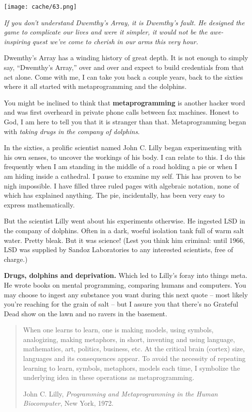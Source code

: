 \documentclass[12pt,twoside]{report}
\begin{document}
	\texttt{[image: cache/63.png]}

{\em If you don't understand Dwemthy's Array, it is Dwemthy's
  fault. He designed the game to complicate our lives and were it
  simpler, it would not be the awe-inspiring quest we've come to
  cherish in our arms this very hour.}

Dwemthy's Array has a winding history of great depth.  It is not
enough to simply say, ``Dwemthy's Array,'' over and over and expect to
build credentials from that act alone.  Come with me, I can take you
back a couple years, back to the sixties where it all started with
metaprogramming and the dolphins.

You might be inclined to think that {\bf metaprogramming} is another
hacker word and was first overheard in private phone calls between fax
machines.  Honest to God, I am here to tell you that it is stranger
than that. Metaprogramming began with {\em taking drugs in the company
  of dolphins}.

In the sixties, a prolific scientist named John C. Lilly began
experimenting with his own senses, to uncover the workings of his
body.  I can relate to this.  I do this frequently when I am standing
in the middle of a road holding a pie or when I am hiding inside a
cathedral.  I pause to examine my self.  This has proven to be nigh
impossible.  I have filled three ruled pages with algebraic notation,
none of which has explained anything.  The pie, incidentally, has been
very easy to express mathematically.

But the scientist Lilly went about his experiments otherwise.  He
ingested LSD in the company of dolphins. Often in a dark, woeful
isolation tank full of warm salt water.  Pretty bleak.  But it was
science!  (Lest you think him criminal: until 1966, LSD was supplied
by Sandoz Laboratories to any interested scientists, free of charge.)

{\bf Drugs, dolphins and deprivation.}  Which led to Lilly's foray
into things meta.  He wrote books on mental programming, comparing
humans and computers.  You may choose to ingest any substance you want
during this next quote -- most likely you're reaching for the grain of
salt -- but I assure you that there's no Grateful Dead show on the
lawn and no ravers in the basement.

\begin{quote}
When one learns to learn, one is making models, using symbols,
analogizing, making metaphors, in short, inventing and using language,
mathematics, art, politics, business, etc. At the critical brain
(cortex) size, languages and its consequences appear. To avoid the
necessity of repeating learning to learn, symbols, metaphors, models
each time, I symbolize the underlying idea in these operations as
metaprogramming.

John C. Lilly, {\em Programming and Metaprogramming in the Human
  Biocomputer}, New York, 1972.

\end{quote}
\end{document}
